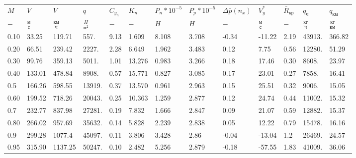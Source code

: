 \begin{tabular}{lllllllllllll}
$M$ & $V$ & $V$ & $q$ & $C_{y_n}$ & $K_n$ & $P_n*10^{-5}$ & $P_p*10^{-5}$ & $\Delta \bar{p}(n_x)$ & $V_y^*$ & $\bar{R}_{кр}$ & $q_{ч}$ & $q_{км}$ \\
$-$ & $\frac{м}{с}$ & $\frac{км}{ч}$ & $\frac{H}{м^2}$ & $-$ & $-$ & $H$ & $H$ & $-$ & $\frac{м}{с}$ & $-$ & $\frac{кг}{ч}$ & $\frac{кг}{км}$ \\
0.10 & 33.25 & 119.71 & 557. & 9.13 & 1.609 & 8.108 & 3.708 & -0.34 & -11.22 & 2.19 & 43913. & 366.82 \\
0.20 & 66.51 & 239.42 & 2227. & 2.28 & 6.649 & 1.962 & 3.483 & 0.12 & 7.75 & 0.56 & 12280. & 51.29 \\
0.30 & 99.76 & 359.13 & 5011. & 1.01 & 13.276 & 0.983 & 3.266 & 0.18 & 17.46 & 0.30 & 8608. & 23.97 \\
0.40 & 133.01 & 478.84 & 8908. & 0.57 & 15.771 & 0.827 & 3.085 & 0.17 & 23.01 & 0.27 & 7858. & 16.41 \\
0.5 & 166.26 & 598.55 & 13919. & 0.37 & 13.570 & 0.961 & 2.963 & 0.15 & 25.51 & 0.32 & 9006. & 15.05 \\
0.60 & 199.52 & 718.26 & 20043. & 0.25 & 10.363 & 1.259 & 2.877 & 0.12 & 24.74 & 0.44 & 11002. & 15.32 \\
0.7 & 232.77 & 837.98 & 27281. & 0.19 & 7.832 & 1.666 & 2.847 & 0.09 & 21.07 & 0.59 & 12882. & 15.37 \\
0.80 & 266.02 & 957.69 & 35632. & 0.14 & 5.828 & 2.239 & 2.838 & 0.05 & 12.22 & 0.79 & 15478. & 16.16 \\
0.9 & 299.28 & 1077.4 & 45097. & 0.11 & 3.806 & 3.428 & 2.86 & -0.04 & -13.04 & 1.2 & 26469. & 24.57 \\
0.95 & 315.90 & 1137.25 & 50247. & 0.10 & 2.482 & 5.256 & 2.879 & -0.18 & -57.55 & 1.83 & 41009. & 36.06 \\
\end{tabular}
